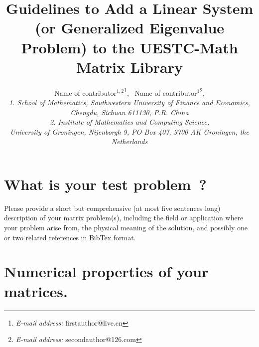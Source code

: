 \documentclass[12pt]{article}
\date{}
\begin{document}
%
%
\title{Guidelines to Add a Linear System (or Generalized Eigenvalue Problem) to the 
UESTC-Math Matrix Library}

\author{Name of contributor$^{1,2}$\footnote{\textit{E-mail address:} firstauthor@live.cn},
\mbox{ }Name of contributor$^1$\footnote{\textit{E-mail address:} secondauthor@126.com},
\\
{\footnotesize{\it 1. School of Mathematics, Southwestern University of Finance and Economics,
Chengdu, Sichuan 611130, P.R. China}}\\
{\footnotesize{\it 2. Institute of Mathematics and Computing Science,}}\\
{\footnotesize{\it University of Groningen, Nijenborgh 9, PO Box 407, 9700 AK
Groningen, the Netherlands}}
}
\maketitle


\section{What is your test problem~?}
Please provide a short but comprehensive (at most five sentences long) description of your matrix problem(s), including the field or application where your problem arise from, the physical meaning of the solution, and possibly one or two related references in BibTex format.


\section{Numerical properties of your matrices.}
\label{sec2}
\end{document}
